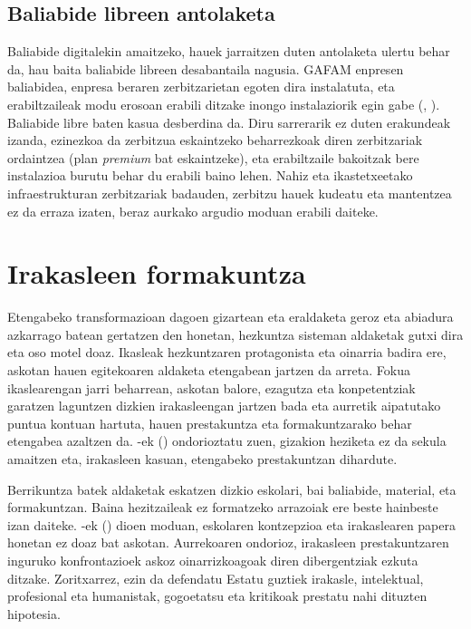 \subsection{Baliabide libreen antolaketa}\label{subsec:baliabide_antolakuntza}
Baliabide digitalekin amaitzeko, hauek jarraitzen duten antolaketa ulertu behar da, hau baita baliabide libreen desabantaila nagusia. GAFAM enpresen baliabidea, enpresa beraren zerbitzarietan egoten dira instalatuta, eta erabiltzaileak modu erosoan erabili ditzake inongo instalaziorik egin gabe (\citeauthor{burger2019distributed}, \citeyear{burger2019distributed}). Baliabide libre baten kasua desberdina da. Diru sarrerarik ez duten erakundeak izanda, ezinezkoa da zerbitzua eskaintzeko beharrezkoak diren zerbitzariak ordaintzea (plan \textit{premium} bat eskaintzeke), eta erabiltzaile bakoitzak bere instalazioa burutu behar du erabili baino lehen. Nahiz eta ikastetxeetako infraestrukturan zerbitzariak badauden, zerbitzu hauek kudeatu eta mantentzea ez da erraza izaten, beraz aurkako argudio moduan erabili daiteke.

\section{Irakasleen formakuntza}\label{sec:formakuntza}

Etengabeko transformazioan dagoen gizartean eta eraldaketa geroz eta abiadura azkarrago batean gertatzen den honetan, hezkuntza sisteman aldaketak gutxi dira eta oso motel doaz. Ikasleak hezkuntzaren protagonista eta oinarria badira ere, askotan hauen egitekoaren aldaketa etengabean jartzen da arreta. Fokua ikaslearengan jarri beharrean, askotan balore, ezagutza eta konpetentziak garatzen laguntzen dizkien irakasleengan jartzen bada eta aurretik aipatutako puntua kontuan hartuta, hauen prestakuntza eta formakuntzarako behar etengabea azaltzen da. \citeauthor{bosch2018konpetentzia}-ek (\citeyear{bosch2018konpetentzia}) ondorioztatu zuen, gizakion heziketa ez da sekula amaitzen eta, irakasleen kasuan, etengabeko prestakuntzan dihardute.

Berrikuntza batek aldaketak eskatzen dizkio eskolari, bai baliabide, material, eta formakuntzan. Baina hezitzaileak ez formatzeko arrazoiak ere beste hainbeste izan daiteke. \citeauthor{perrenoud2001formacion}-ek (\citeyear{perrenoud2001formacion}) dioen moduan, eskolaren kontzepzioa eta irakaslearen papera honetan ez doaz bat askotan. Aurrekoaren ondorioz, irakasleen prestakuntzaren inguruko konfrontazioek askoz oinarrizkoagoak diren dibergentziak ezkuta ditzake. Zoritxarrez, ezin da defendatu Estatu guztiek irakasle, intelektual, profesional eta humanistak, gogoetatsu eta kritikoak prestatu nahi dituzten hipotesia.

